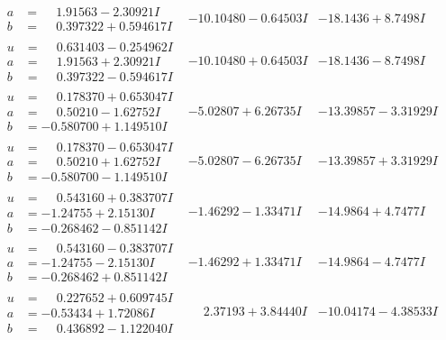 \documentclass[1p]{elsarticle_modified}
\theoremstyle{definition}
\begin{document}
$$\begin{array}{c|c|c}
\begin{aligned}
a &= \phantom{-}1.91563 - 2.30921 I \\
b &= \phantom{-}0.397322 + 0.594617 I\end{aligned}
 & -10.10480 - 0.64503 I & -18.1436 + 8.7498 I \\ \hline\begin{aligned}
u &= \phantom{-}0.631403 - 0.254962 I \\
a &= \phantom{-}1.91563 + 2.30921 I \\
b &= \phantom{-}0.397322 - 0.594617 I\end{aligned}
 & -10.10480 + 0.64503 I & -18.1436 - 8.7498 I \\ \hline\begin{aligned}
u &= \phantom{-}0.178370 + 0.653047 I \\
a &= \phantom{-}0.50210 - 1.62752 I \\
b &= -0.580700 + 1.149510 I\end{aligned}
 & -5.02807 + 6.26735 I & -13.39857 - 3.31929 I \\ \hline\begin{aligned}
u &= \phantom{-}0.178370 - 0.653047 I \\
a &= \phantom{-}0.50210 + 1.62752 I \\
b &= -0.580700 - 1.149510 I\end{aligned}
 & -5.02807 - 6.26735 I & -13.39857 + 3.31929 I \\ \hline\begin{aligned}
u &= \phantom{-}0.543160 + 0.383707 I \\
a &= -1.24755 + 2.15130 I \\
b &= -0.268462 - 0.851142 I\end{aligned}
 & -1.46292 - 1.33471 I & -14.9864 + 4.7477 I \\ \hline\begin{aligned}
u &= \phantom{-}0.543160 - 0.383707 I \\
a &= -1.24755 - 2.15130 I \\
b &= -0.268462 + 0.851142 I\end{aligned}
 & -1.46292 + 1.33471 I & -14.9864 - 4.7477 I \\ \hline\begin{aligned}
u &= \phantom{-}0.227652 + 0.609745 I \\
a &= -0.53434 + 1.72086 I \\
b &= \phantom{-}0.436892 - 1.122040 I\end{aligned}
 & \phantom{-}2.37193 + 3.84440 I & -10.04174 - 4.38533 I \\ \hline\begin{aligned}

\end{aligned}
\end{array}$$
\end{document}
